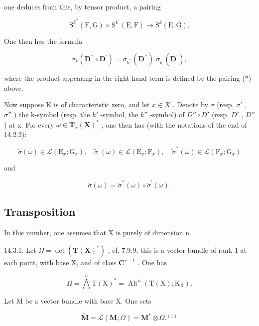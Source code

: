 one deduces from this, by tensor product, a pairing

\[
\mathrm{S} ^ {k ^ {\prime \prime}} (\mathrm{F}, \mathrm{G}) \times \mathrm{S} ^ {k ^ {\prime}} (\mathrm{E}, \mathrm{F}) \rightarrow \mathrm{S} ^ {k} (\mathrm{E}, \mathrm{G}).\tag{*}
\]

One then has the formula

\[
\sigma_ {k} (\mathbf {D} ^ {\prime \prime} \circ \mathbf {D} ^ {\prime}) = \sigma_ {k ^ {\prime \prime}} (\mathbf {D} ^ {\prime \prime}). \sigma_ {k ^ {\prime}} (\mathbf {D} ^ {\prime}),
\]

where the product appearing in the right-hand term is defined by the pairing (*) above.

Now suppose K is of characteristic zero, and let \(x \in X\) . Denote by \(\sigma\) (resp. \(\sigma'\) , \(\sigma''\) ) the k-symbol (resp. the \(k'\) -symbol, the \(k''\) -symbol) of \(D'' \circ D'\) (resp. \(D'\) , \(D''\) ) at x. For every \(\omega \in \mathbf{T}_{x}(\mathbf{X})^{*}\) , one then has (with the notations of the end of 14.2.2):

\[
\tilde {\sigma} (\omega) \in \mathscr {L} (\mathrm{E} _ {x}; \mathrm{G} _ {x}), \quad \tilde {\sigma} ^ {\prime} (\omega) \in \mathscr {L} (\mathrm{E} _ {x}; \mathrm{F} _ {x}), \quad \tilde {\sigma} ^ {\prime \prime} (\omega) \in \mathscr {L} (\mathrm{F} _ {x}; \mathrm{G} _ {x})
\]

and

\[
\tilde {\sigma} (\omega) = \tilde {\sigma} ^ {\prime \prime} (\omega) \circ \tilde {\sigma} ^ {\prime} (\omega).
\]

\subsection{Transposition}

In this number, one assumes that X is purely of dimension n.

14.3.1. Let \(\Omega = \det(\mathbf{T}(\mathbf{X})^{*})\) , cf. 7.9.9; this is a vector bundle of rank 1 at each point, with base X, and of class \(\mathbf{C}^{r-1}\) . One has

\[
\Omega = \bigwedge^ {n} \mathrm{T} (\mathrm{X}) ^ {*} = \operatorname{Alt} ^ {n} (\mathrm{T} (\mathrm{X}); \mathrm{K} _ {\mathrm{X}}).
\]

Let M be a vector bundle with base X. One sets

\[
\tilde {\mathbf {M}} = \mathcal {L} (\mathbf {M}; \Omega) = \mathbf {M} ^ {*} \otimes \Omega . ^ {(1)}
\]

